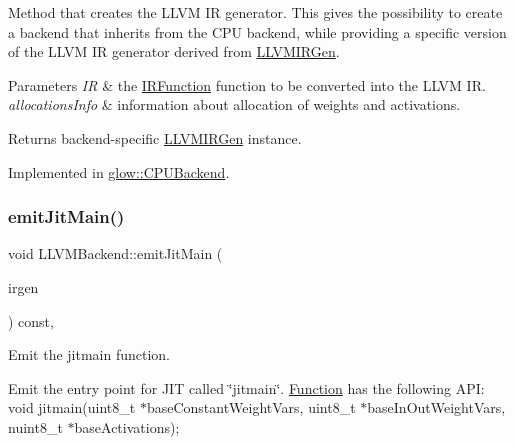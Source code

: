 Method that creates the L\+L\+VM IR generator. This gives the possibility to create a backend that inherits from the C\+PU backend, while providing a specific version of the L\+L\+VM IR generator derived from \hyperlink{classglow_1_1_l_l_v_m_i_r_gen}{L\+L\+V\+M\+I\+R\+Gen}. 
\begin{DoxyParams}{Parameters}
{\em IR} & the \hyperlink{classglow_1_1_i_r_function}{I\+R\+Function} function to be converted into the L\+L\+VM IR. \\
\hline
{\em allocations\+Info} & information about allocation of weights and activations. \\
\hline
\end{DoxyParams}
\begin{DoxyReturn}{Returns}
backend-\/specific \hyperlink{classglow_1_1_l_l_v_m_i_r_gen}{L\+L\+V\+M\+I\+R\+Gen} instance. 
\end{DoxyReturn}


Implemented in \hyperlink{classglow_1_1_c_p_u_backend_a09cf2b220300c5cd9234e6476d3ab3df}{glow\+::\+C\+P\+U\+Backend}.

\mbox{\label{classglow_1_1_l_l_v_m_backend_a7bb1a7a95ce1fc155e80f4f48147fd35}} 
\subsubsection{\texorpdfstring{emit\+Jit\+Main()}{emitJitMain()}}
{\footnotesize\ttfamily void L\+L\+V\+M\+Backend\+::emit\+Jit\+Main (\begin{DoxyParamCaption}\item[{\hyperlink{classglow_1_1_l_l_v_m_i_r_gen}{L\+L\+V\+M\+I\+R\+Gen} \&}]{irgen }\end{DoxyParamCaption}) const\hspace{0.3cm}{\ttfamily [protected]}, {\ttfamily [virtual]}}



Emit the jitmain function. 

Emit the entry point for J\+IT called \char`\"{}jitmain\char`\"{}. \hyperlink{classglow_1_1_function}{Function} has the following A\+PI\+: void jitmain(uint8\+\_\+t $\ast$base\+Constant\+Weight\+Vars, uint8\+\_\+t $\ast$base\+In\+Out\+Weight\+Vars, nuint8\+\_\+t $\ast$base\+Activations); \mbox{\label{classglow_1_1_l_l_v_m_backend_ad7cf7f0d70f27878dc5164dd2367a51b}} 
